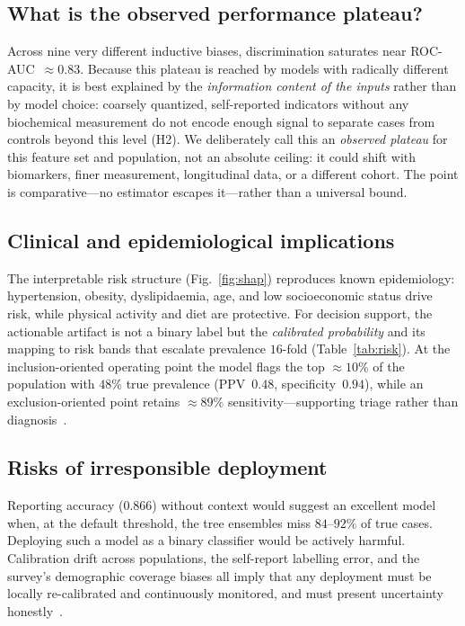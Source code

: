 \documentclass[conference]{IEEEtran}
\begin{document}
\subsection{What is the observed performance plateau?}
Across nine very different inductive biases, discrimination saturates near
ROC-AUC~$\approx0.83$. Because this plateau is reached by models with radically
different capacity, it is best explained by the \emph{information content of the inputs}
rather than by model choice: coarsely quantized, self-reported indicators without any
biochemical measurement do not encode enough signal to separate cases from controls
beyond this level (H2). We deliberately call this an \emph{observed plateau} for this
feature set and population, not an absolute ceiling: it could shift with biomarkers, finer
measurement, longitudinal data, or a different cohort. The point is comparative---no
estimator escapes it---rather than a universal bound.

\subsection{Clinical and epidemiological implications}
The interpretable risk structure (Fig.~\ref{fig:shap}) reproduces known epidemiology:
hypertension, obesity, dyslipidaemia, age, and low socioeconomic status drive risk,
while physical activity and diet are protective. For decision support, the actionable
artifact is not a binary label but the \emph{calibrated probability} and its mapping to
risk bands that escalate prevalence $16$-fold (Table~\ref{tab:risk}). At the
inclusion-oriented operating point the model flags the top $\approx10\%$ of the
population with $48\%$ true prevalence (PPV~$0.48$, specificity~$0.94$), while an
exclusion-oriented point retains $\approx89\%$ sensitivity---supporting triage rather
than diagnosis~\cite{vancalster2019calibration}.

\subsection{Risks of irresponsible deployment}
Reporting accuracy ($0.866$) without context would suggest an excellent model when, at
the default threshold, the tree ensembles miss $84$--$92\%$ of true cases. Deploying
such a model as a binary classifier would be actively harmful. Calibration drift across
populations, the self-report labelling error, and the survey's demographic coverage
biases all imply that any deployment must be locally re-calibrated and continuously
monitored, and must present uncertainty honestly~\cite{rudin2019stop,ghassemi2021false}.
\end{document}
